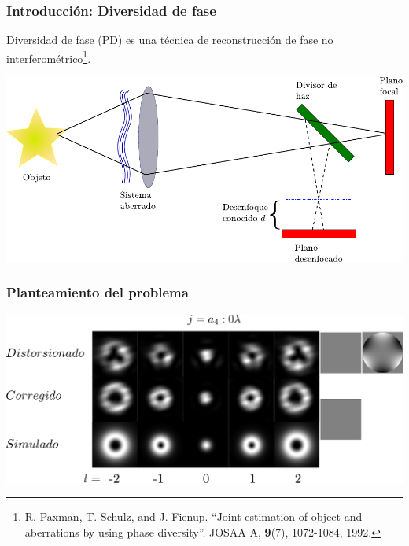 \documentclass[serif,8pt]{beamer}
\begin{document}
	
		\begin{frame}
		\frametitle{Introducción: Diversidad de fase}
				Diversidad de fase (PD) es una técnica de reconstrucción de fase no interferométrico\footnote{R. Paxman, T. Schulz, and J. Fienup. ``Joint estimation of object and aberrations by using phase diversity''. JOSAA A, \textbf{9}(7), 1072-1084, 1992.}.
				
			\includegraphics[scale=0.5]{img/pd.pdf}
		\end{frame}


		\begin{frame}
		\frametitle{Planteamiento del problema}
			\includegraphics[scale=0.65]{img/exp_res_correction.pdf}
		\end{frame}		


\end{document}
